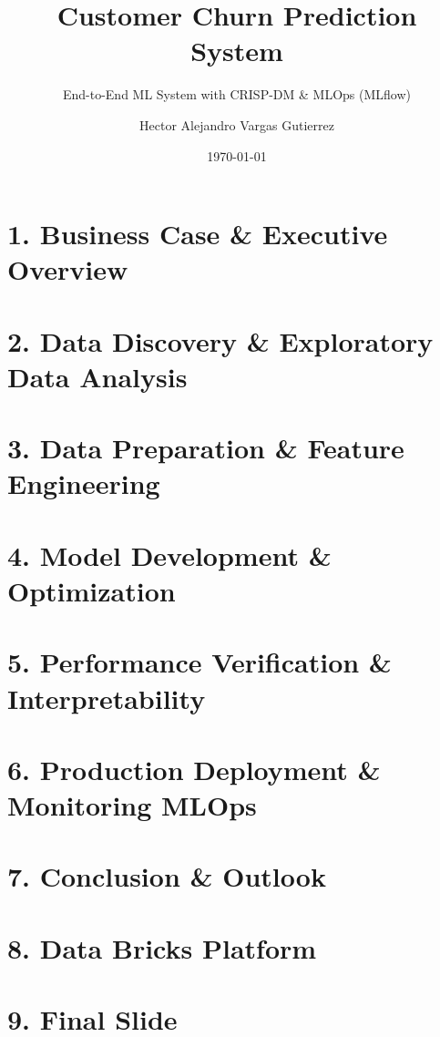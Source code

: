 \documentclass{beamer}
\title{Customer Churn Prediction System}
\subtitle{End-to-End ML System with CRISP-DM \& MLOps (MLflow)}
\author{Hector Alejandro Vargas Gutierrez}
\date{\today}
\begin{document}
\begin{frame}
    \titlepage
\end{frame}

\section{1. Business Case \& Executive Overview}


\section{2. Data Discovery \& Exploratory Data Analysis}


\section{3. Data Preparation \& Feature Engineering}


\section{4. Model Development \& Optimization}


\section{5. Performance Verification \& Interpretability}


\section{6. Production Deployment \& Monitoring MLOps}


\section{7. Conclusion \& Outlook}


\section{8. Data Bricks Platform}


\section{9. Final Slide}

\end{document}
